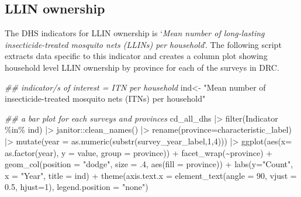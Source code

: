 \documentclass[
  letterpaper,
  DIV=11,
  numbers=noendperiod]{scrreprt}
\newenvironment{Shaded}{\begin{snugshade}}{\end{snugshade}}
\newcommand{\AttributeTok}[1]{\textcolor[rgb]{0.40,0.45,0.13}{#1}}
\newcommand{\DecValTok}[1]{\textcolor[rgb]{0.68,0.00,0.00}{#1}}
\newcommand{\DocumentationTok}[1]{\textcolor[rgb]{0.37,0.37,0.37}{\textit{#1}}}
\newcommand{\FloatTok}[1]{\textcolor[rgb]{0.68,0.00,0.00}{#1}}
\newcommand{\FunctionTok}[1]{\textcolor[rgb]{0.28,0.35,0.67}{#1}}
\newcommand{\NormalTok}[1]{\textcolor[rgb]{0.00,0.23,0.31}{#1}}
\newcommand{\OtherTok}[1]{\textcolor[rgb]{0.00,0.23,0.31}{#1}}
\newcommand{\SpecialCharTok}[1]{\textcolor[rgb]{0.37,0.37,0.37}{#1}}
\newcommand{\StringTok}[1]{\textcolor[rgb]{0.13,0.47,0.30}{#1}}
\begin{document}
\hypertarget{llin-ownership}{%
\subsection{LLIN ownership}\label{llin-ownership}}

The DHS indicators for LLIN ownership is `\emph{Mean number of
long-lasting insecticide-treated mosquito nets (LLINs) per household}'.
The following script extracts data specific to this indicator and
creates a column plot showing household level LLIN ownership by province
for each of the surveys in DRC.

\begin{Shaded}
\begin{Highlighting}[]
\DocumentationTok{\#\# indicator/s of interest = ITN per household}
\NormalTok{ind}\OtherTok{\textless{}{-}} \StringTok{"Mean number of insecticide{-}treated mosquito nets (ITNs) per household"}
 
\DocumentationTok{\#\# a bar plot for each surveys and provinces}
\NormalTok{cd\_all\_dhs }\SpecialCharTok{|\textgreater{}}
  \FunctionTok{filter}\NormalTok{(Indicator }\SpecialCharTok{\%in\%}\NormalTok{ ind) }\SpecialCharTok{|\textgreater{}}
\NormalTok{  janitor}\SpecialCharTok{::}\FunctionTok{clean\_names}\NormalTok{() }\SpecialCharTok{|\textgreater{}}  
  \FunctionTok{rename}\NormalTok{(}\AttributeTok{province=}\NormalTok{characteristic\_label) }\SpecialCharTok{|\textgreater{}}
  \FunctionTok{mutate}\NormalTok{(}\AttributeTok{year =} \FunctionTok{as.numeric}\NormalTok{(}\FunctionTok{substr}\NormalTok{(survey\_year\_label,}\DecValTok{1}\NormalTok{,}\DecValTok{4}\NormalTok{))) }\SpecialCharTok{|\textgreater{}}
  \FunctionTok{ggplot}\NormalTok{(}\FunctionTok{aes}\NormalTok{(}\AttributeTok{x=} \FunctionTok{as.factor}\NormalTok{(year), }\AttributeTok{y =}\NormalTok{ value, }\AttributeTok{group =}\NormalTok{ province)) }\SpecialCharTok{+}
  \FunctionTok{facet\_wrap}\NormalTok{(}\SpecialCharTok{\textasciitilde{}}\NormalTok{province) }\SpecialCharTok{+}
  \FunctionTok{geom\_col}\NormalTok{(}\AttributeTok{position =} \StringTok{"dodge"}\NormalTok{, }\AttributeTok{size =}\NormalTok{ .}\DecValTok{4}\NormalTok{, }\FunctionTok{aes}\NormalTok{(}\AttributeTok{fill =}\NormalTok{ province)) }\SpecialCharTok{+}
  \FunctionTok{labs}\NormalTok{(}\AttributeTok{y=}\StringTok{"Count"}\NormalTok{, }\AttributeTok{x =} \StringTok{"Year"}\NormalTok{,}
       \AttributeTok{title =}\NormalTok{ ind) }\SpecialCharTok{+}
  \FunctionTok{theme}\NormalTok{(}\AttributeTok{axis.text.x =} \FunctionTok{element\_text}\NormalTok{(}\AttributeTok{angle =} \DecValTok{90}\NormalTok{, }\AttributeTok{vjust =} \FloatTok{0.5}\NormalTok{, }\AttributeTok{hjust=}\DecValTok{1}\NormalTok{),}
        \AttributeTok{legend.position =} \StringTok{"none"}\NormalTok{)}
\end{Highlighting}
\end{Shaded}
\end{document}
